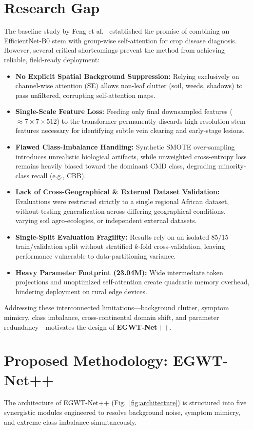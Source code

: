 \documentclass[conference]{IEEEtran}
\let\origsection\section
\renewcommand{\section}{\needspace{6\baselineskip}\origsection}
\begin{document}
\section{Research Gap}
The baseline study by Feng et al.~\cite{feng2024} established the promise of combining an EfficientNet-B0 stem with group-wise self-attention for crop disease diagnosis. However, several critical shortcomings prevent the method from achieving reliable, field-ready deployment:
\begin{itemize}
    \item \textbf{No Explicit Spatial Background Suppression:} Relying exclusively on channel-wise attention (SE) allows non-leaf clutter (soil, weeds, shadows) to pass unfiltered, corrupting self-attention maps.
    \item \textbf{Single-Scale Feature Loss:} Feeding only final downsampled features ($\approx 7 \times 7 \times 512$) to the transformer permanently discards high-resolution stem features necessary for identifying subtle vein clearing and early-stage lesions.
    \item \textbf{Flawed Class-Imbalance Handling:} Synthetic SMOTE over-sampling introduces unrealistic biological artifacts, while unweighted cross-entropy loss remains heavily biased toward the dominant CMD class, degrading minority-class recall (e.g., CBB).
    \item \textbf{Lack of Cross-Geographical \& External Dataset Validation:} Evaluations were restricted strictly to a single regional African dataset, without testing generalization across differing geographical conditions, varying soil agro-ecologies, or independent external datasets.
    \item \textbf{Single-Split Evaluation Fragility:} Results rely on an isolated 85/15 train/validation split without stratified $k$-fold cross-validation, leaving performance vulnerable to data-partitioning variance.
    \item \textbf{Heavy Parameter Footprint (23.04M):} Wide intermediate token projections and unoptimized self-attention create quadratic memory overhead, hindering deployment on rural edge devices.
\end{itemize}
Addressing these interconnected limitations—background clutter, symptom mimicry, class imbalance, cross-continental domain shift, and parameter redundancy—motivates the design of \textbf{EGWT-Net++}.

\section{Proposed Methodology: EGWT-Net++}
The architecture of EGWT-Net++ (Fig.~\ref{fig:architecture}) is structured into five synergistic modules engineered to resolve background noise, symptom mimicry, and extreme class imbalance simultaneously.
\end{document}

